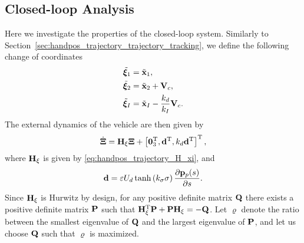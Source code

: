\subsection{Closed-loop Analysis}
Here we investigate the properties of the closed-loop system.
Similarly to Section~\ref{sec:handpos_trajectory_trajectory_tracking}, we define the following change of coordinates
\begin{subequations}
    \begin{align}
        \tilde{\bm{\xi}}_1 &= \tilde{\mathbf{x}}_1, \\
        \tilde{\bm{\xi}}_2 &= \tilde{\mathbf{x}}_2 + \mathbf{V}_c, \\
        \tilde{\bm{\xi}}_I &= \tilde{\mathbf{x}}_I - \frac{k_d}{k_I}\mathbf{V}_c.
    \end{align} \label{eq:handpos_trajectory_hand_transform_CL_path}
\end{subequations}
The external dynamics of the vehicle are then given by
\begin{equation}
    \dot{\bm{\Xi}} = \mathbf{H}_{\xi}\bm{\Xi} + \left[\mathbf{0}_3^{\mathrm{T}}, \mathbf{d}^{\mathrm{T}}, k_d \mathbf{d}^{\mathrm{T}}\right]^{\mathrm{T}}, \label{eq:handpos_trajectory_external_dynamics_path}
\end{equation}
where $\mathbf{H}_{\xi}$ is given by \eqref{eq:handpos_trajectory_H_xi}, and
\begin{equation}
    \mathbf{d} = \varepsilon U_d \tanh\left(k_{\sigma}\sigma\right) \frac{\partial \mathbf{p}_p(s)}{\partial s}. \label{eq:handpos_trajectory_external_perturbation}
\end{equation}
Since $\mathbf{H}_{\xi}$ is Hurwitz by design, for any positive definite matrix $\mathbf{Q}$ there exists a positive definite matrix $\mathbf{P}$ such that $\mathbf{H}_{\xi}^{\mathrm{T}} \mathbf{P} + \mathbf{P} \mathbf{H}_{\xi} = -\mathbf{Q}$.
Let $\varrho$ denote the ratio between the smallest eigenvalue of $\mathbf{Q}$ and the largest eigenvalue of $\mathbf{P}$, and let us choose $\mathbf{Q}$ such that $\varrho$ is maximized.

